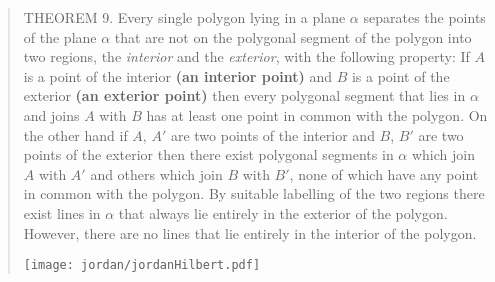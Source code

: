 \begin{quotation}
  THEOREM 9. Every single polygon lying in a plane $\alpha$ separates the points of the plane $\alpha$ that are not on the polygonal segment of the polygon into two regions, the \emph{interior} and the \emph{exterior}, with the following property: If $A$ is a point of the interior {\bfseries (an interior point)} and $B$ is a point of the exterior {\bfseries (an exterior point)} then every polygonal segment that lies in $\alpha$ and joins $A$ with $B$ has at least one point in common with the polygon. On the other hand if $A$, $A'$ are two points of the interior and $B$, $B'$ are two points of the exterior then there exist polygonal segments in $\alpha$ which join $A$ with $A'$ and others which join $B$ with $B'$, none of which have any point in common with the polygon. By suitable labelling of the two regions there exist lines in $\alpha$ that always lie entirely in the exterior of the polygon. However, there are no lines that lie entirely in the interior of the polygon.

  \centering\texttt{[image: jordan/jordanHilbert.pdf]}
\end{quotation}




